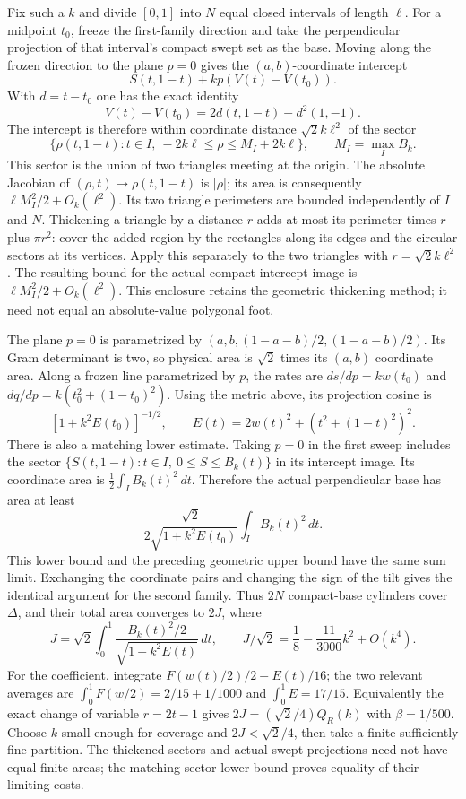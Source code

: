 Fix such a $k$ and divide $[0,1]$ into $N$ equal closed intervals of
length $\ell$. For a midpoint $t_0$, freeze the first-family direction
and take the perpendicular projection of that interval's compact swept
set as the base. Moving along the frozen direction to the plane $p=0$
gives the $(a,b)$-coordinate intercept
\[
 S(t,1-t)+kp(V(t)-V(t_0)).
\]
With $d=t-t_0$ one has the exact identity
\begin{equation}\label{eq:barycentric-quadratic-identity}
 V(t)-V(t_0)=2d(t,1-t)-d^2(1,-1).
\end{equation}
The intercept is therefore within coordinate distance
$\sqrt2 k\ell^2$ of the sector
\[
 \{\rho(t,1-t):t\in I,\ -2k\ell\le\rho\le M_I+2k\ell\},
 \qquad M_I=\max_I B_k.
\]
This sector is the union of two triangles meeting at the origin. The
absolute Jacobian of $(\rho,t)\mapsto\rho(t,1-t)$ is $|\rho|$;
its area is consequently $\ell M_I^2/2+O_k(\ell^2)$. Its two triangle
perimeters are bounded independently of $I$ and $N$. Thickening a
triangle by a distance $r$ adds at most its perimeter times $r$ plus
$\pi r^2$: cover the added region by the rectangles along its edges
and the circular sectors at its vertices. Apply this separately to the
two triangles with $r=\sqrt2 k\ell^2$. The resulting bound for the
actual compact intercept image is
$\ell M_I^2/2+O_k(\ell^2)$. This enclosure retains the geometric
thickening method; it need not equal an absolute-value polygonal foot.

The plane $p=0$ is parametrized by
$(a,b,(1-a-b)/2,(1-a-b)/2)$. Its Gram determinant is two, so physical
area is $\sqrt2$ times its $(a,b)$ coordinate area. Along a frozen
line parametrized by $p$, the rates are
$ds/dp=kw(t_0)$ and $dq/dp=k(t_0^2+(1-t_0)^2)$.
Using the metric above, its projection cosine is
\[
 [1+k^2 E(t_0)]^{-1/2},\qquad
 E(t)=2w(t)^2+(t^2+(1-t)^2)^2.
\]
There is also a matching lower estimate. Taking $p=0$ in the first
sweep includes the sector
$\{S(t,1-t):t\in I,\ 0\le S\le B_k(t)\}$ in its intercept image.
Its coordinate area is $\tfrac12\int_I B_k(t)^2\,dt$. Therefore the
actual perpendicular base has area at least
\[
 \frac{\sqrt2}{2\sqrt{1+k^2E(t_0)}}
       \int_I B_k(t)^2\,dt.
\]
This lower bound and the preceding geometric upper bound have the same
sum limit. Exchanging the coordinate pairs and changing the sign of the
tilt gives the identical argument for the second family. Thus $2N$
compact-base cylinders cover $\Delta$, and their total area converges
to $2J$, where
\[
 J=\sqrt2\int_0^1
 \frac{B_k(t)^2/2}{\sqrt{1+k^2E(t)}}\,dt,
 \qquad J/\sqrt2=\frac18-\frac{11}{3000}k^2+O(k^4).
\]
For the coefficient, integrate
$F(w(t)/2)/2-E(t)/16$; the two relevant averages are
$\int_0^1 F(w/2)=2/15+1/1000$ and $\int_0^1E=17/15$.
Equivalently the exact change of variable $r=2t-1$ gives
$2J=(\sqrt2/4)Q_R(k)$ with $\beta=1/500$.
Choose $k$ small enough for coverage and $2J<\sqrt2/4$, then take
a finite sufficiently fine partition. The thickened sectors and actual
swept projections need not have equal finite areas; the matching sector
lower bound proves equality of their limiting costs.
